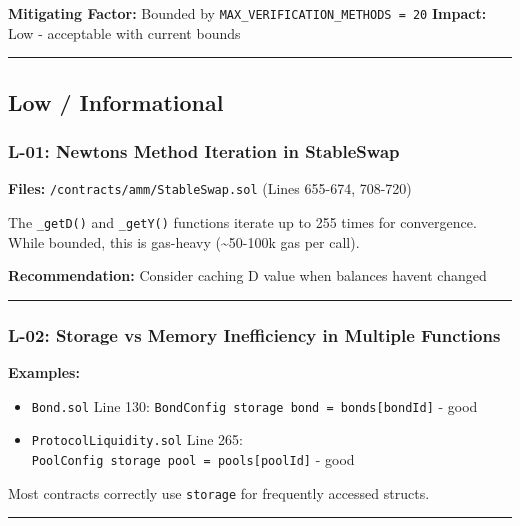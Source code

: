 \documentclass[
]{article}
\providecommand{\tightlist}{%
  \setlength{\itemsep}{0pt}\setlength{\parskip}{0pt}}
\begin{document}
\textbf{Mitigating Factor:} Bounded by
\texttt{MAX\_VERIFICATION\_METHODS\ =\ 20} \textbf{Impact:} Low -
acceptable with current bounds

\begin{center}\rule{0.5\linewidth}{0.5pt}\end{center}

\subsection{Low / Informational}\label{low--informational}

\subsubsection{L-01: Newton\textquotesingle s Method Iteration in
StableSwap}\label{l-01-newtons-method-iteration-in-stableswap}

\textbf{Files:} \texttt{/contracts/amm/StableSwap.sol} (Lines 655-674,
708-720)

The \texttt{\_getD()} and \texttt{\_getY()} functions iterate up to 255
times for convergence. While bounded, this is gas-heavy
(\textasciitilde50-100k gas per call).

\textbf{Recommendation:} Consider caching D value when balances
haven\textquotesingle t changed

\begin{center}\rule{0.5\linewidth}{0.5pt}\end{center}

\subsubsection{L-02: Storage vs Memory Inefficiency in Multiple
Functions}\label{l-02-storage-vs-memory-inefficiency-in-multiple-functions}

\textbf{Examples:}

\begin{itemize}
\tightlist
\item
  \texttt{Bond.sol} Line 130:
  \texttt{BondConfig\ storage\ bond\ =\ bonds{[}bondId{]}} - good
\item
  \texttt{ProtocolLiquidity.sol} Line 265:
  \texttt{PoolConfig\ storage\ pool\ =\ pools{[}poolId{]}} - good
\end{itemize}

Most contracts correctly use \texttt{storage} for frequently accessed
structs.

\begin{center}\rule{0.5\linewidth}{0.5pt}\end{center}
\end{document}
